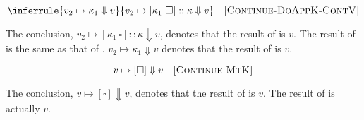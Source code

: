 \[
  \inferrule
  { v_2\mapsto\kappa_1\Downarrow v }
  { v_2\mapsto[\kappa_1\ \square]::\kappa\Downarrow v }
  \quad\textsc{[Continue-DoAppK-ContV]}
\]

The conclusion, $v_2\mapsto[\kappa_1\ \square]::\kappa\Downarrow v$, denotes that
the result of 
is $v$. The result of  is the same as that of .
$v_2\mapsto\kappa_1\Downarrow v$ denotes that the result of
 is $v$.

\[
  v\mapsto[\square]\Downarrow v
  \quad\textsc{[Continue-MtK]}
\]

The conclusion, $v\mapsto[\square]\Downarrow v$, denotes that the result of
 is $v$. The result of  is
actually $v$.
